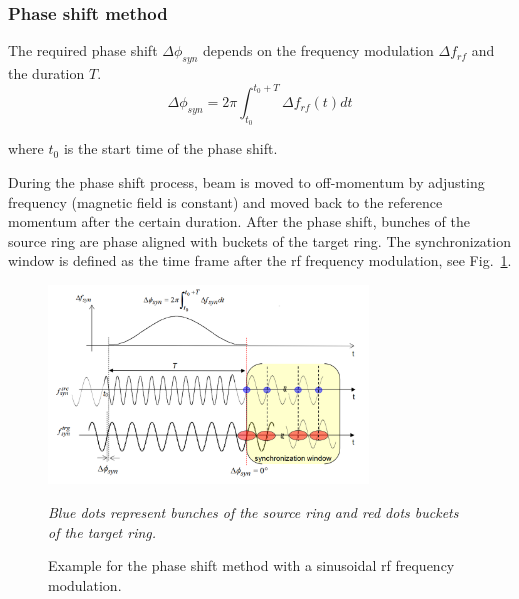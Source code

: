 \subsubsection{Phase shift method}
The required phase shift $\Delta \phi_\mathit{syn}$ depends on the frequency modulation $\Delta f_\mathit{rf}$ and the duration $T$. 
\begin{equation}
\Delta \phi_\mathit{syn}= 2\pi \int_{t_0}^{t_0+T} \Delta f_\mathit{rf}(t)dt \label{phase1}
\end{equation}

where $t_0$ is the start time of the phase shift.

During the phase shift process, beam is moved to off-momentum by adjusting frequency (magnetic field is constant) and moved back to the reference momentum after the certain duration. After the phase shift, bunches of the source ring are phase aligned with buckets of the target ring. The synchronization window is defined as the time frame after the rf frequency modulation, see Fig.~\ref{phase_shift}.
\begin{figure}[!htb]
   \centering   
   \includegraphics*[width=85mm]{phase_shift.png}
   \caption{Example for the phase shift method with a sinusoidal rf frequency modulation.}{\textsl{\small{Blue dots represent bunches of the source ring and red dots buckets of the target ring.}}}
   \label{phase_shift}
\end{figure} 

